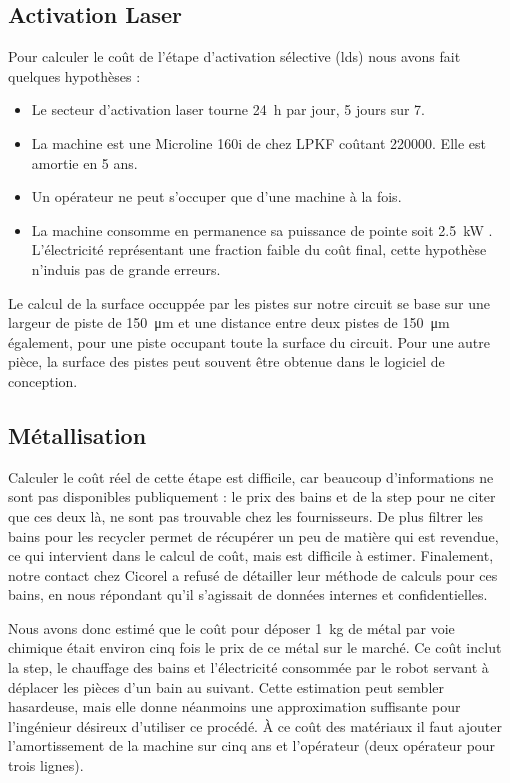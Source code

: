 \subsection{Activation Laser}
Pour calculer le coût de l'étape d'activation sélective (\gls{lds}) nous avons fait quelques hypothèses :
\begin{itemize}
    \item Le secteur d'activation laser tourne \SI{24}{\hour} par jour, 5 jours sur 7.
    \item La machine est une Microline 160i de chez LPKF coûtant \SI{220000}{\chf}.
        Elle est amortie en 5 ans.
    \item Un opérateur ne peut s'occuper que d'une machine à la fois.
    \item La machine consomme en permanence sa puissance de pointe soit \SI{2.5}{\kilo\watt} \cite{lpkf-microline-series}.
        L'électricité représentant une fraction faible du coût final, cette hypothèse n'induis pas de grande erreurs.
\end{itemize}

Le calcul de la surface occuppée par les pistes sur notre circuit se base sur une largeur de piste de \SI{150}{\micro\meter} et une
distance entre deux pistes de \SI{150}{\micro\meter} également, pour une piste occupant toute la surface du circuit.
Pour une autre pièce, la surface des pistes peut souvent être obtenue dans le logiciel de conception.



\subsection{Métallisation}
Calculer le coût réel de cette étape est difficile, car beaucoup d'informations ne sont pas disponibles publiquement : le prix des bains et de la \gls{step} pour ne citer que ces deux là, ne sont pas trouvable chez les fournisseurs.
De plus filtrer les bains pour les recycler permet de récupérer un peu de matière qui est revendue, ce qui intervient dans le calcul de coût, mais est difficile à estimer.
Finalement, notre contact chez Cicorel a refusé de détailler leur méthode de calculs pour ces bains, en nous répondant qu'il s'agissait de données internes et confidentielles.

Nous avons donc estimé que le coût pour déposer \SI{1}{\kilogram} de métal par voie chimique était environ cinq fois le prix de ce métal sur le marché.
Ce coût inclut la \gls{step}, le chauffage des bains et l'électricité consommée par le robot servant à déplacer les pièces d'un bain au suivant. 
Cette estimation peut sembler hasardeuse, mais elle donne néanmoins une approximation suffisante pour l'ingénieur désireux d'utiliser ce procédé.
À ce coût des matériaux il faut ajouter l'amortissement de la machine sur cinq ans et l'opérateur (deux opérateur pour trois lignes).

